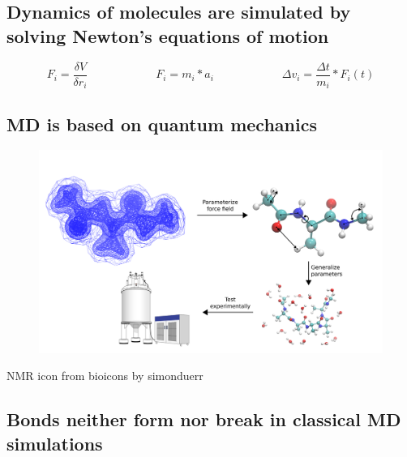 \documentclass[
  letterpaper,
  DIV=11,
  numbers=noendperiod]{scrartcl}
\begin{document}
\hypertarget{dynamics-of-molecules-are-simulated-by-solving-newtons-equations-of-motion}{%
\subsection{Dynamics of molecules are simulated by solving Newton's
equations of
motion}\label{dynamics-of-molecules-are-simulated-by-solving-newtons-equations-of-motion}}

\[ F_i = \frac{\delta V}{\delta r_i} \qquad \qquad \qquad F_i = m_i * a_i  \qquad \qquad \qquad   \Delta v_i = \frac{\Delta t}{m_i} * F_i(t)
\]

\hypertarget{md-is-based-on-quantum-mechanics}{%
\subsection{MD is based on quantum
mechanics}\label{md-is-based-on-quantum-mechanics}}

\begin{figure}

{\centering \includegraphics{www/Parameterization_compr.png}

}

\end{figure}

NMR icon from bioicons by simonduerr

\hypertarget{bonds-neither-form-nor-break-in-classical-md-simulations}{%
\subsection{Bonds neither form nor break in classical MD
simulations}\label{bonds-neither-form-nor-break-in-classical-md-simulations}}
\end{document}
